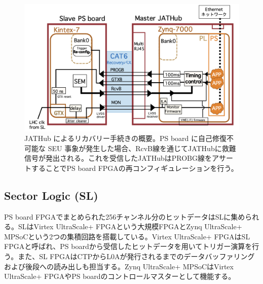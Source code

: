     \begin{figure} 
    \centering
    \includegraphics[width=16cm]{fig/QAQC/JATHubsem.png}
    \caption[JATHub によるリカバリー手続きの概要]{JATHub によるリカバリー手続きの概要\cite{mt_atanaka}。PS board に自己修復不可能な SEU 事象が発生した場合、RcvB線を通じてJATHubに救難信号が発出される。これを受信したJATHubはPROBG線をアサートすることでPS board FPGAの再コンフィギュレーションを行う。}
    \label{JATHubsem}
    \end{figure}

        \subsection*{Sector Logic  (SL) }
PS board FPGAでまとめられた256チャンネル分のヒットデータはSLに集められる。SLはVirtex UltraScale+ FPGAという大規模FPGAとZynq UltraScale+ MPSoCという2つの集積回路を搭載している。Virtex UltraScale+ FPGAはSL FPGAと呼ばれ、PS boardから受信したヒットデータを用いてトリガー演算を行う。また、SL FPGAはCTPからL0Aが発行されるまでのデータバッファリングおよび後段への読み出しも担当する。Zynq UltraScale+ MPSoCはVirtex UltraScale+ FPGAやPS boardのコントロールマスターとして機能する。

